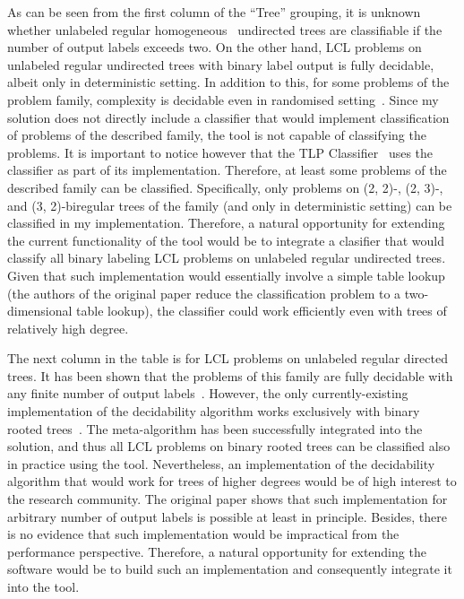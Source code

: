 As can be seen from the first column of the ``Tree'' grouping, it is unknown whether
unlabeled regular homogeneous~\cite{BalliuHomogeneous}
undirected trees are classifiable if the number of
output labels exceeds two. On the other hand, LCL problems on
unlabeled regular undirected trees with binary label output is fully decidable, albeit
only in deterministic setting. In addition to this, for some problems of the problem family,
complexity is decidable even in randomised setting~\cite{Balliu2019c}.
Since my solution does not directly include a classifier that would implement
classification of problems of the described family, the tool is not capable of
classifying the problems. It is important to notice however that the TLP
Classifier~\cite{Rocher2020clas} uses the classifier as part of its implementation.
Therefore, at least some problems of the described family can be classified. Specifically,
only problems on (2, 2)-, (2, 3)-, and (3, 2)-biregular trees of the family
(and only in deterministic setting) can be classified in my implementation.
Therefore, a natural opportunity for extending the current functionality of the tool
would be to integrate a clasifier that would classify all binary labeling LCL problems
on unlabeled regular undirected trees. Given that such implementation would
essentially involve a simple table lookup (the authors of the original paper
reduce the classification problem to a two-dimensional table lookup), the
classifier could work efficiently even with trees of relatively high degree.

The next column in the table is for LCL problems on unlabeled regular directed
trees. It has been shown that the problems of this family are fully decidable
with any finite number of output labels~\cite{Balliu2021}. However, the
only currently-existing implementation of the decidability algorithm
works exclusively with binary rooted trees~\cite{Studeny2021}. The
meta-algorithm has been successfully integrated into the solution, and
thus all LCL problems on binary rooted trees can be classified also in
practice using the tool. Nevertheless, an implementation of the
decidability algorithm that would work for trees of higher degrees
would be of high interest to the research community. The original
paper shows that such implementation for arbitrary number of output
labels is possible at least in principle. Besides, there is no
evidence that such implementation would be impractical from the
performance perspective. Therefore, a natural opportunity for
extending the software would be to build such an implementation and
consequently integrate it into the tool.

